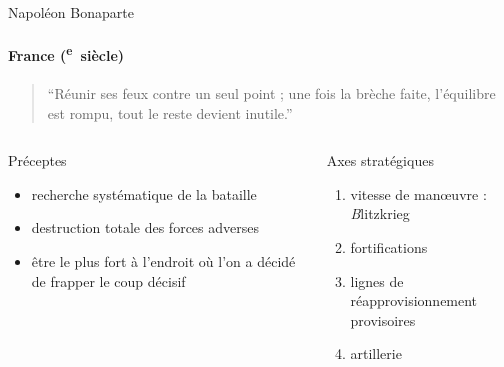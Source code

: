 \documentclass[utf8,hyperref={pagebackref}]{beamer}
\newcommand{\cRM}[1]{\MakeUppercase{\romannumeral #1}}  %
\newcommand{\siecle}[1]{\cRM{#1}\textsuperscript{e}~siècle}
\begin{document}
\begin{frame}{Napoléon Bonaparte}
\framesubtitle{France (\siecle{18})}
\begin{quote}“Réunir ses feux contre un seul point ; une fois la brèche faite, l’équilibre est rompu, tout le reste devient inutile.”\end{quote}
\vfill
\begin{columns}[t]
\begin{column}{0.5\linewidth}
Préceptes
\begin{itemize}
\item recherche systématique de la bataille
\item destruction totale des forces adverses
\item être le plus fort à l’endroit où l’on a décidé de frapper le coup décisif
\end{itemize}
\end{column}
\begin{column}{0.5\linewidth}
Axes stratégiques
\begin{enumerate}
\item vitesse de manœuvre : {\emph Blitzkrieg}
\item fortifications
\item lignes de réapprovisionnement provisoires
\item artillerie
\end{enumerate}
\end{column}
\end{columns}
\end{frame}
\end{document}
